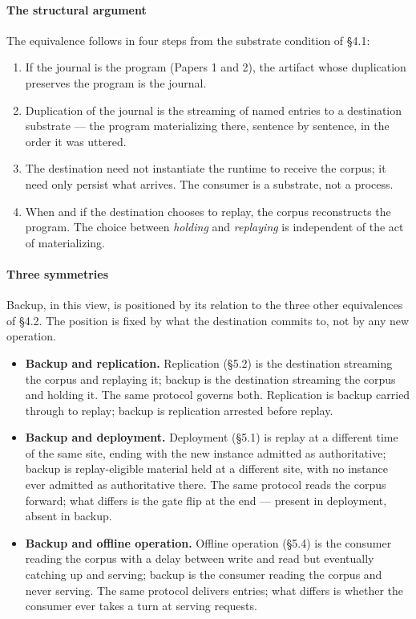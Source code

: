 \documentclass[
]{article}
\providecommand{\tightlist}{%
  \setlength{\itemsep}{0pt}\setlength{\parskip}{0pt}}
\begin{document}
\paragraph{The structural argument}\label{the-structural-argument}

The equivalence follows in four steps from the substrate condition of
§4.1:

\begin{enumerate}
\def\labelenumi{\arabic{enumi}.}
\tightlist
\item
  If the journal is the program (Papers 1 and 2), the artifact whose
  duplication preserves the program is the journal.
\item
  Duplication of the journal is the streaming of named entries to a
  destination substrate --- the program materializing there, sentence by
  sentence, in the order it was uttered.
\item
  The destination need not instantiate the runtime to receive the
  corpus; it need only persist what arrives. The consumer is a
  substrate, not a process.
\item
  When and if the destination chooses to replay, the corpus reconstructs
  the program. The choice between \emph{holding} and \emph{replaying} is
  independent of the act of materializing.
\end{enumerate}

\paragraph{Three symmetries}\label{three-symmetries}

Backup, in this view, is positioned by its relation to the three other
equivalences of §4.2. The position is fixed by what the destination
commits to, not by any new operation.

\begin{itemize}
\tightlist
\item
  \textbf{Backup and replication.} Replication (§5.2) is the destination
  streaming the corpus and replaying it; backup is the destination
  streaming the corpus and holding it. The same protocol governs both.
  Replication is backup carried through to replay; backup is replication
  arrested before replay.
\item
  \textbf{Backup and deployment.} Deployment (§5.1) is replay at a
  different time of the same site, ending with the new instance admitted
  as authoritative; backup is replay-eligible material held at a
  different site, with no instance ever admitted as authoritative there.
  The same protocol reads the corpus forward; what differs is the gate
  flip at the end --- present in deployment, absent in backup.
\item
  \textbf{Backup and offline operation.} Offline operation (§5.4) is the
  consumer reading the corpus with a delay between write and read but
  eventually catching up and serving; backup is the consumer reading the
  corpus and never serving. The same protocol delivers entries; what
  differs is whether the consumer ever takes a turn at serving requests.
\end{itemize}
\end{document}
